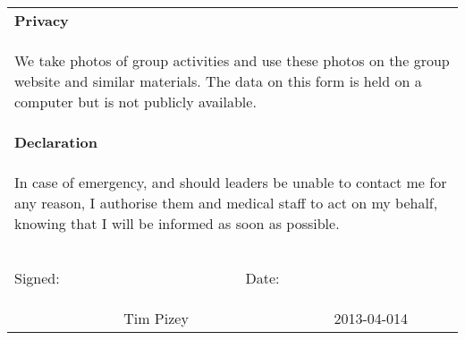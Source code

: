 \documentclass [12pt, a4paper] {article}
\begin{document}
\begin{table}
\begin{tabular}{|p{2.5cm}p{5cm}|p{2.5cm}p{5cm}|}
\hline
\multicolumn{4}{|p{15cm}|}{\textbf{Privacy}}\\
\multicolumn{4}{|p{15cm}|}{
\begin{singlespace}
We take photos of group activities and use these photos on the group website and similar materials. 
The data on this form is held on a computer but is not publicly available.
\end{singlespace}
}\\
\hline
\multicolumn{4}{|p{15cm}|}{\textbf{Declaration}}\\
\multicolumn{4}{|p{15cm}|}{
\begin{singlespace}
In case of emergency, and should leaders be unable to contact me for any reason, 
I authorise them and medical staff to act on my behalf, 
knowing that I will be informed as soon as possible.
\end{singlespace}
}\\
\hline
\begin{doublespace}
Signed:  
\end{doublespace}
&                 &  Date:  &  
\\
              & Tim Pizey &            & 2013-04-014 \\
\hline
\end{tabular}
\label{tab:methodTypes}
\end{table}
\end{document}
